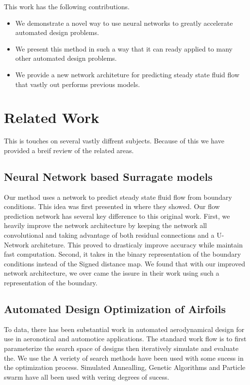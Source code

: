 \documentclass{article} %
\begin{document}
This work has the following contributions.
\begin{itemize}
  \item We demonstrate a novel way to use neural networks to greatly accelerate automated design problems.
  \item We present this method in such a way that it can ready applied to many other automated design problems.
  \item We provide a new network architeture for predicting steady state fluid flow that vastly out performs previous models.
\end{itemize}

\section{Related Work}

This is touches on several vastly diffrent subjects. Because of this we have provided a breif review of the related areas.

\subsection{Neural Network based Surragate models}


Our method uses a network to predict steady state fluid flow from boundary conditions. This idea was first presented in \citep{guo2016convolutional} where they showed. Our flow prediction network has several key difference to this original work. First, we heavily improve the network architecture by keeping the network all convolutional and taking advantage of both residual connections and a U-Network architeture. This proved to drasticaly improve accuracy while maintain fast computation. Second, it takes in the binary representation of the boundary conditions instead of the Signed distance map. We found that with our improved network architecture, we over came the issure in their work using such a representation of the boundary.

\subsection{Automated Design Optimization of Airfoils}

To data, there has been substantial work in automated aerodynamical design for use in aeronotical and automotice applications. The standard work flow is to first parameterize the search space of designs then iteratively simulate and evaluate the. We use the A veriety of search methods have been used with some sucess in the optimization process. Simulated Annealling, Genetic Algorithms and Particle swarm have all been used with vering degrees of sucess. 
\end{document}
